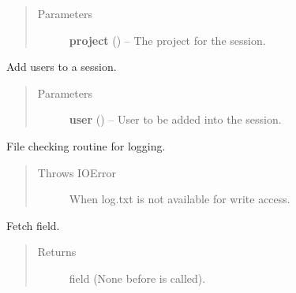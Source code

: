 \documentclass[letterpaper,10pt,english]{sphinxmanual}
\begin{document}
\begin{fulllineitems}
\begin{description}
\end{description}
\begin{quote}\begin{description}
\item[{Parameters}] \leavevmode
\textbf{project} ({\hyperref[models:models.Project]{}}) -- The project for the session.

\end{description}\end{quote}

\begin{fulllineitems}
\label{models:models.Session.AddUser}
Add users to a session.
\begin{quote}\begin{description}
\item[{Parameters}] \leavevmode
\textbf{user} ({\hyperref[models:models.User]{}}) -- User to be added into the session.

\end{description}\end{quote}

\end{fulllineitems}


\begin{fulllineitems}
\label{models:models.Session.FileRoutine}
File checking routine for logging.
\begin{quote}\begin{description}
\item[{Throws IOError}] \leavevmode
When log.txt is not available for write access.

\end{description}\end{quote}

\end{fulllineitems}


\begin{fulllineitems}
\label{models:models.Session.GetLastChecked}
Fetch  field.
\begin{quote}\begin{description}
\item[{Returns}] \leavevmode
{} field (None before
 is called).


\end{description}
\end{quote}
\end{fulllineitems}
\end{fulllineitems}
\end{document}
